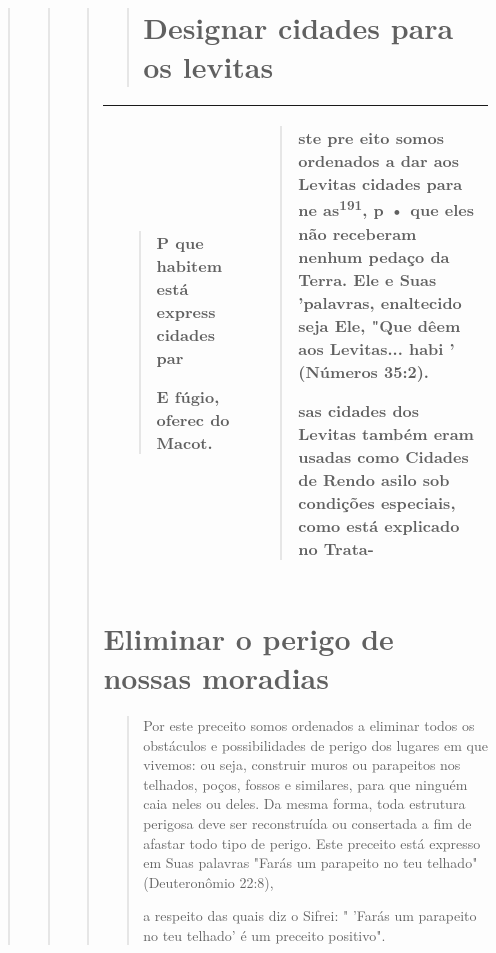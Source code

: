 \begin{quote}
\begin{quote}
\begin{quote}
\begin{quote}
\section{Designar cidades para os  levitas}

\end{quote}

\begin{longtable}[]{@{}ll@{}}
\toprule
\endhead
\begin{minipage}[t]{0.47\columnwidth}\raggedright
\begin{quote}
P que habitem está express cidades par

E fúgio, oferec do Macot.
\end{quote}\strut
\end{minipage} & \begin{minipage}[t]{0.47\columnwidth}\raggedright
\begin{quote}
ste pre eito somos ordenados a dar aos Levitas cidades para ne
as\textsuperscript{191}, p • que eles não receberam nenhum pedaço da
Terra. Ele e Suas 'palavras, enaltecido seja Ele, "Que dêem aos
Levitas... habi ' (Números 35:2).

sas cidades dos Levitas também eram usadas como Cidades de Re­ndo asilo
sob condições especiais, como está explicado no Trata-
\end{quote}\strut
\end{minipage}\tabularnewline
\bottomrule
\end{longtable}

\section{Eliminar o perigo de nossas moradias}

\begin{quote}
Por este preceito somos ordenados a eliminar todos os obstáculos e
possibilidades de perigo dos lugares em que vivemos: ou seja, construir
mu­ros ou parapeitos nos telhados, poços, fossos e similares, para que
ninguém caia neles ou deles. Da mesma forma, toda estrutura perigosa
deve ser reconstruída ou consertada a fim de afastar todo tipo de
perigo. Este preceito está expresso em Suas palavras "Farás um parapeito
no teu telhado" (Deuteronômio 22:8),



a respeito das quais diz o Sifrei: " 'Farás um parapeito no teu telhado'
é um preceito positivo".
\end{quote}


\end{quote}
\end{quote}
\end{quote}
